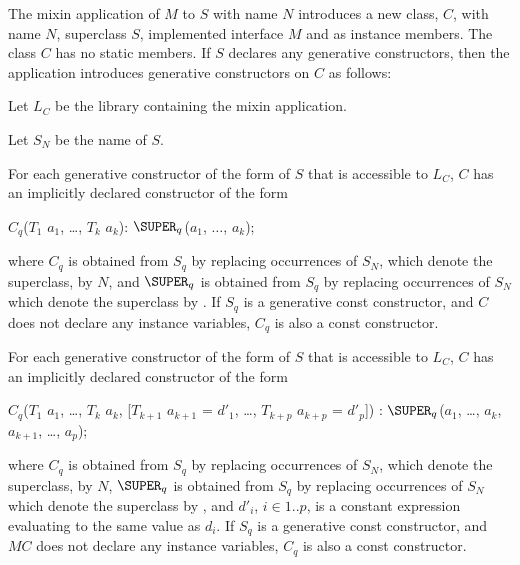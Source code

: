 \documentclass[makeidx]{article}
\begin{document}
\LMHash{}%
The mixin application of $M$ to $S$ with name $N$ introduces a new
class, $C$, with name $N$, superclass $S$,
implemented interface $M$
and  as instance members.
The class $C$ has no static members.
If $S$ declares any generative constructors, then the application
introduces generative constructors on $C$ as follows:

\LMHash{}%
Let $L_C$ be the library containing the mixin application.

Let $S_N$ be the name of $S$.

For each generative constructor of the form  of $S$ that is accessible to $L_C$, $C$ has an implicitly declared constructor of the form

\begin{normativeDartCode}
$C_q$($T_{1}$ $a_{1}$, \ldots, $T_{k}$ $a_{k}$): $\SUPER_q$($a_{1}$, $\ldots$, $a_{k}$);
\end{normativeDartCode}

\noindent
where $C_q$ is obtained from $S_q$ by replacing occurrences of $S_N$,
which denote the superclass, by $N$, and $\SUPER_q$ is obtained from $S_q$ by
replacing occurrences of $S_N$ which denote the superclass by \SUPER{}.
If $S_q$ is a generative const constructor, and $C$ does not declare any
instance variables, $C_q$ is also a const constructor.

\LMHash{}%
For each generative constructor of the form  of $S$ that is accessible to $L_C$, $C$ has an implicitly declared constructor of the form

\begin{normativeDartCode}
$C_q$($T_{1}$ $a_{1}$, \ldots , $T_{k}$ $a_{k}$, [$T_{k+1}$ $a_{k+1}$ = $d'_{1}$, \ldots , $T_{k+p}$ $a_{k+p}$ = $d'_p$])
    : $\SUPER_q$($a_{1}$, \ldots , $a_{k}$, $a_{k+1}$, \ldots, $a_p$);
\end{normativeDartCode}

\noindent
where $C_q$ is obtained from $S_q$ by replacing occurrences of $S_N$,
which denote the superclass, by $N$,
$\SUPER_q$ is obtained from $S_q$ by replacing occurrences of $S_N$
which denote the superclass by \SUPER{},
and $d'_i$, $i \in 1..p$, is a constant expression evaluating
to the same value as $d_i$.
If $S_q$ is a generative const constructor, and $MC$ does not declare any
instance variables, $C_q$ is also a const constructor.
\end{document}
